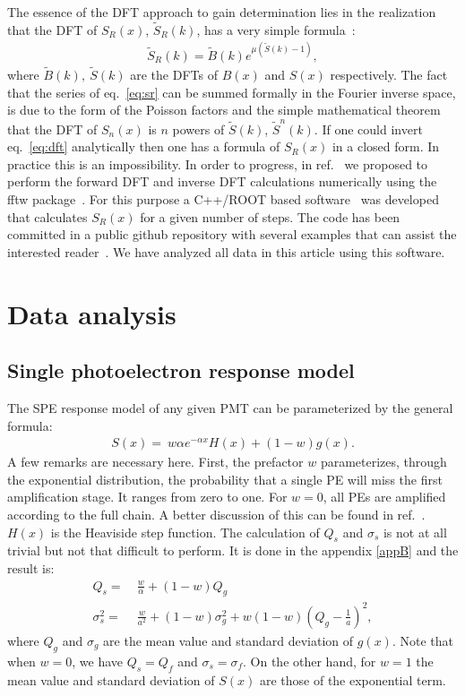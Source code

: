 \documentclass[a4paper,11pt]{article}
\begin{document}
The essence of the DFT approach to gain determination lies in the realization that the DFT of $S_R(x)$, $\tilde S_R(k)$, has a very simple formula~\cite{me}:
\begin{align}
\tilde S_R(k) = \tilde B(k) e^{ \mu( \tilde S(k) - 1 ) } , \label{eq:dft}
\end{align}
where $\tilde B(k), \ \tilde S(k)$ are the DFTs of $B(x)$ and $S(x)$ respectively. 
The fact that the series of eq.~\eqref{eq:sr} can be summed formally in the Fourier inverse space, 
is due to the form of the Poisson factors and the simple mathematical theorem that the DFT of $S_n(x)$ is $n$ powers of $\tilde S(k)$, $\tilde S^n(k)$. 
If one could invert eq.~\eqref{eq:dft} analytically then one has a formula of $S_R(x)$ in a closed form. In practice this is an impossibility.  
In order to progress, in ref.~\cite{me} we proposed to perform the forward DFT and inverse DFT calculations numerically using the fftw package~\cite{fftw}. 
For this purpose a C++/ROOT based software~\cite{root} was developed that calculates $S_R(x)$ for a given number of steps.
The code has been committed in a public github repository with several examples that can assist the interested reader~\cite{git}. 
We have analyzed all data in this article using this software. 


\section{Data analysis}
\label{sec:data}
%

\subsection{Single photoelectron response model}
 
 The SPE response model of any given PMT can be parameterized by the general formula:
 \begin{align}
S(x) =    \ w \alpha e^{-\alpha x } H(x) + (1-w)g(x). \label{eq:S}
\end{align}
A few remarks are necessary here. 
First, the prefactor $w$ parameterizes, through the exponential distribution, the probability that a single PE will miss the first amplification stage. 
It ranges from zero to one. For $w=0$, all PEs are amplified according to the full chain. 
A better discussion of this can be found in ref.~\cite{dossi}. 
$H(x)$ is the Heaviside step function.  
The calculation of $Q_s$ and $\sigma_s$ is not at all trivial but not that difficult to perform. 
It is done in the appendix \ref{appB} and the result is:
\begin{align}
Q_s = & \ \frac{w}{\alpha} + (1-w)Q_g \label{eq:qs} \\ 
\sigma_s^2       = & \ \frac{w}{a^2} +(1-w)\sigma_g^2 + w(1-w)\left( Q_g -\frac{1}{a} \right)^2,
\end{align}
where $Q_g$ and $\sigma_g$ are the mean value and standard deviation of $g(x)$.
Note that when $w=0$, we have $Q_s=Q_f$ and $\sigma_s=\sigma_f$. 
On the other hand, for $w=1$ the mean value and standard deviation of $S(x)$ are those of the exponential term.  
\end{document}
